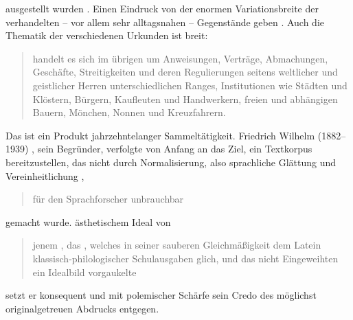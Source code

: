 ausgestellt wurden
\autocites[vgl.][575]{frenz1998a}[585]{frenz1998b}. Einen Eindruck von der
enormen Variationsbreite der verhandelten -- vor allem sehr alltagsnahen --
Gegen\-stände geben \textcites[11]{schulze2011}[35--36]{ganslmayer2012}.
%
%
Auch die Thematik der verschiedenen Urkunden ist
breit: \blockcquote[596]{schmidtwiegand1998b}{ handelt es sich im
übrigen um Anweisungen, Verträge, Abmachungen, Geschäfte, Streitigkeiten und
deren Regulierungen seitens weltlicher und geistlicher Herren unterschiedlichen
Ranges, Institutionen wie Städten und Klöstern, Bürgern, Kaufleuten und
Handwerkern, freien und abhängigen Bauern, Mönchen, Nonnen und Kreuzfahrern.}

Das \CAO{} ist ein Produkt jahrzehntelanger Sammeltätigkeit. Friedrich
Wilhelm\nocite{wilhelm1932} (1882--1939)%
, sein Begründer, verfolgte von Anfang an das Ziel, ein Textkorpus
bereitzustellen, das nicht durch Normalisierung, also sprachliche Glättung und
Vereinheitlichung \autocites[vgl.][76--84]{bein2011}{kragl2015},
\blockcquote[\RN{60}]{wilhelm1932}{für den Sprachforscher unbrauchbar} gemacht
wurde.  ästhetischem Ideal von
\blockcquote[\RN{3}]{wilhelm1932}{jenem , das
 \textelp{}, welches in seiner
sauberen Gleichmäßigkeit dem Latein klassisch-philologischer Schulausgaben
glich, und das \textelp{} nicht Eingeweihten ein Idealbild vorgaukelte} setzt
er konsequent und mit polemischer Schärfe sein Credo des möglichst
originalgetreuen Abdrucks entgegen.

